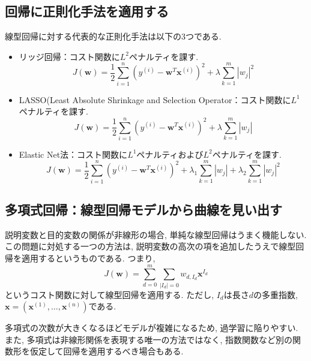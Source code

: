 \documentclass[uplatex]{jsarticle}
\theoremstyle{definition}
\numberwithin{equation}{section}
\begin{document}
\subsection{回帰に正則化手法を適用する}
線型回帰に対する代表的な正則化手法は以下の3つである.
\begin{itemize}
    \item
    リッジ回帰：コスト関数に$L^{2}$ペナルティを課す.
    \begin{equation}
        J(\bm{w}) = \frac{1}{2}\sum_{i = 1}^{n} (y^{(i)} - \bm{w}^{T}\bm{x}^{(i)})^{2} + \lambda\sum_{k = 1}^{m} |w_{j}|^{2}
    \end{equation}

    \item
    LASSO(Least Absolute Shrinkage and Selection Operator：コスト関数に$L^{1}$ペナルティを課す.
    \begin{equation}
        J(\bm{w}) = \frac{1}{2}\sum_{i = 1}^{n} (y^{(i)} - \bm{w}^{T}\bm{x}^{(i)})^{2} + \lambda\sum_{k = 1}^{m} |w_{j}|
    \end{equation}

    \item
    Elastic Net法：コスト関数に$L^{1}$ペナルティおよび$L^{2}$ペナルティを課す.
    \begin{equation}
        J(\bm{w}) = \frac{1}{2}\sum_{i = 1}^{n} (y^{(i)} - \bm{w}^{T}\bm{x}^{(i)})^{2} + \lambda_{1}\sum_{k = 1}^{m} |w_{j}| + \lambda_{2}\sum_{k = 1}^{m} |w_{j}|^{2}
    \end{equation}
\end{itemize}

\subsection{多項式回帰：線型回帰モデルから曲線を見い出す}
説明変数と目的変数の関係が非線形の場合, 単純な線型回帰はうまく機能しない.
この問題に対処する一つの方法は, 説明変数の高次の項を追加したうえで線型回帰を適用するというものである.
つまり,
\begin{equation}
    J(\bm{w}) = \sum_{d = 0}^{m} \sum_{|I_{d}| = 0}w_{d, I_{d}}\bm{x}^{I_{d}}
\end{equation}
というコスト関数に対して線型回帰を適用する.
ただし, $I_{d}$は長さ$d$の多重指数, $\bm{x} = (\bm{x}^{(1)}, \dots, \bm{x}^{(n)})$である.

多項式の次数が大きくなるほどモデルが複雑になるため, 過学習に陥りやすい.
また, 多項式は非線形関係を表現する唯一の方法ではなく, 指数関数など別の関数形を仮定して回帰を適用するべき場合もある.
\end{document}
